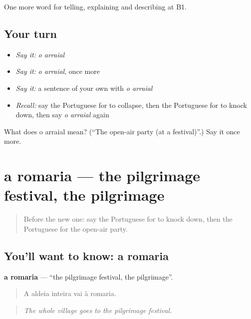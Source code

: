 \begin{grammarlens}[title={What you've built}]
One more word for telling, explaining and describing at B1.
\end{grammarlens}

\subsection*{Your turn}
\begin{itemize}
\raggedright
  \item \emph{Say it:} \emph{o arraial}
  \item \emph{Say it:} \emph{o arraial}, once more
  \item \emph{Say it:} a sentence of your own with \emph{o arraial}
  \item \emph{Recall:} say the Portuguese for to collapse, then the Portuguese for to knock down, then say \emph{o arraial} again
\end{itemize}

\begin{tcolorbox}[breakable,colback=teal!4,colframe=teal!35!black,title={Before you move on}]
What does o arraial mean? (\textquotedblleft{}The open-air party (at a festival)\textquotedblright{}.) Say it once more.
\end{tcolorbox}
\section[a romaria]{a romaria — the pilgrimage festival, the pilgrimage}

\label{lesson:PT-C446-romaria}



\begin{quote}
Before the new one: say the Portuguese for to knock down, then the Portuguese for the open-air party.
\end{quote}

\subsection*{You'll want to know: a romaria}
\textbf{a romaria} — \textquotedblleft{}the pilgrimage festival, the pilgrimage\textquotedblright{}.

\begin{quote}
A aldeia inteira vai à romaria.
\end{quote}

\begin{quote}
\emph{The whole village goes to the pilgrimage festival.}
\end{quote}


